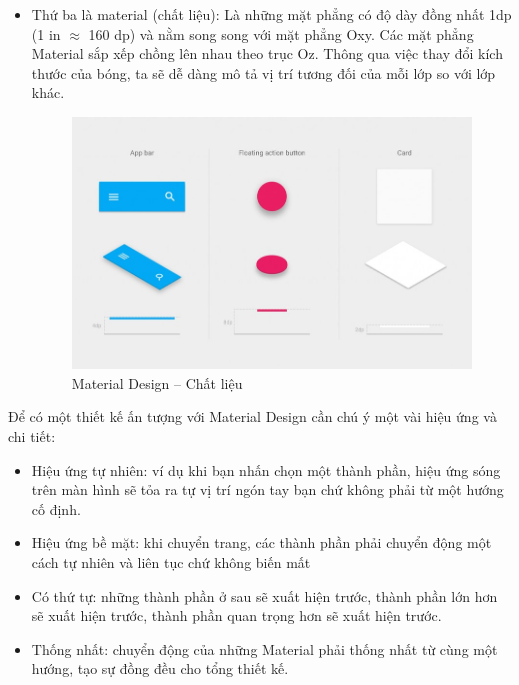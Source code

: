 \begin{itemize}[topsep=0ex]
\item Thứ ba là material (chất liệu): Là những mặt phẳng có độ dày
    đồng nhất 1dp (1 in $\approx$ 160 dp) và nằm song song với mặt phẳng Oxy.
    Các mặt phẳng Material sắp xếp chồng lên nhau theo trục Oz.
    Thông qua việc thay đổi kích thước của bóng, ta sẽ dễ dàng
    mô tả vị trí tương đối của mỗi lớp so với lớp khác.

\begin{figure}[H]
\centering
\includegraphics[width=14cm]{images/material-design-material.png}
\caption{Material Design – Chất liệu}
\end{figure}

\end{itemize}

Để có một thiết kế ấn tượng với Material Design cần
chú ý một vài hiệu ứng và chi tiết:
\begin{itemize}[topsep=0ex]
\item Hiệu ứng tự nhiên: ví dụ khi bạn nhấn chọn một thành phần,
    hiệu ứng sóng trên màn hình sẽ tỏa ra tự vị trí ngón tay
    bạn chứ không phải từ một hướng cố định.

\item Hiệu ứng bề mặt: khi chuyển trang, các thành phần phải chuyển
    động một cách tự nhiên và liên tục chứ không biến mất

\item Có thứ tự: những thành phần ở sau sẽ xuất hiện trước,
    thành phần lớn hơn sẽ xuất hiện trước, thành phần quan trọng
    hơn sẽ xuất hiện trước.

\item Thống nhất: chuyển động của những Material phải thống nhất
    từ cùng một hướng, tạo sự đồng đều cho tổng thiết kế.
\end{itemize}

